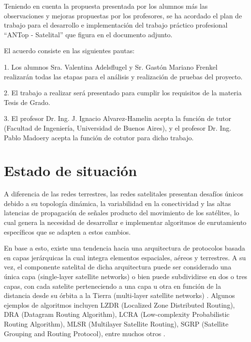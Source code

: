 Teniendo en cuenta la propuesta presentada por los alumnos más las observaciones y mejoras
propuestas por los profesores, se ha acordado el plan de trabajo para el desarrollo e implementación del trabajo práctico profesional “ANTop - Satelital” que
figura en el documento adjunto.


El acuerdo consiste en las siguientes pautas:

1. Los alumnos Sra. Valentina Adelsflugel y Sr. Gastón Mariano Frenkel realizarán todas las etapas para el análisis y realización de
pruebas del proyecto.

2. El trabajo a realizar será presentado para cumplir los requisitos de la materia Tesis de Grado.

3. El profesor Dr. Ing. J. Ignacio Alvarez-Hamelin acepta la función de tutor (Facultad de Ingeniería,
Universidad de Buenos Aires), y el profesor Dr. Ing. Pablo Madoery acepta la función de cotutor para
dicho trabajo.

\vspace{2cm}

\noindent
{} \underline{\hspace{5cm}}

\vspace{1cm}

\noindent
{} \underline{\hspace{5cm}}

\vspace{1cm}

\noindent
{} \underline{\hspace{5cm}}



\section{Estado de situación}
A diferencia de las redes terrestres, las redes satelitales presentan desafíos únicos debido a su topología dinámica, la variabilidad en la conectividad y las altas latencias de propagación de señales producto del movimiento de los satélites, lo cual genera la necesidad de desarrollar e implementar algoritmos de enrutamiento específicos que se adapten a estos cambios.

En base a esto, existe una tendencia hacia una arquitectura de protocolos basada en capas jerárquicas la cual integra elementos espaciales, aéreos y terrestres. A su vez, el componente satelital de dicha arquitectura puede ser considerado una única capa (single-layer satellite networks) o bien puede subdividirse en dos o tres capas, con cada satelite perteneciendo a una capa u otra en función de la distancia desde su órbita a la Tierra (multi-layer satellite networks) \cite{Cao2022-gy}. Algunos ejemplos de algoritmos incluyen LZDR (Localized Zone Distributed Routing), DRA (Datagram Routing Algorithm), LCRA (Low-complexity Probabilistic Routing Algorithm), MLSR (Multilayer Satellite Routing), SGRP (Satellite Grouping and Routing Protocol), entre muchos otros \cite{8932318}.

